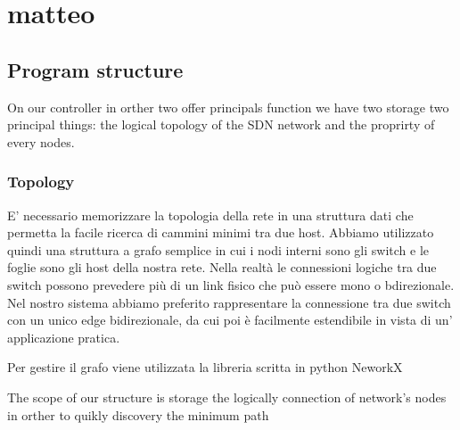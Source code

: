 \documentclass[conference,10pt]{IEEEtran}
\begin{document}
\chapter{matteo}

\section{Program structure}

On our controller in orther two offer principals function we have two storage two principal things: the logical topology of the SDN network and the 
proprirty of every nodes.

\subsection{Topology}
E' necessario memorizzare la topologia della rete in una struttura dati che permetta la facile ricerca di cammini minimi tra due host. 
Abbiamo utilizzato quindi una struttura a grafo semplice in cui i nodi interni sono gli switch e le foglie sono gli host della nostra rete.
Nella realtà le connessioni logiche tra due switch possono prevedere più di un link fisico che può essere mono o bdirezionale.
Nel nostro sistema abbiamo preferito rappresentare la connessione tra due switch con un unico edge bidirezionale, da cui poi è facilmente estendibile
in vista di un' applicazione pratica.

Per gestire il grafo viene utilizzata la libreria scritta in python NeworkX

The scope of our structure is storage the logically connection of network's nodes in orther to quikly discovery the minimum path 
\end{document}
